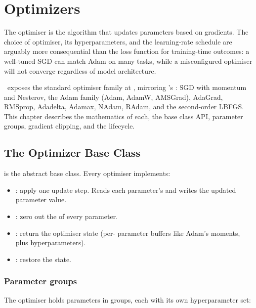 \chapter{Optimizers}
\label{ch:optimizers}

The optimiser is the algorithm that updates parameters based on
gradients. The choice of optimiser, its hyperparameters, and the
learning-rate schedule are arguably more consequential than the
loss function for training-time outcomes: a well-tuned SGD can
match Adam on many tasks, while a misconfigured optimiser will
not converge regardless of model architecture.

\Lucid\ exposes the standard optimiser family at ,
mirroring 's : SGD with momentum
and Nesterov, the Adam family (Adam, AdamW, AMSGrad), AdaGrad,
RMSprop, Adadelta, Adamax, NAdam, RAdam, and the second-order
LBFGS. This chapter describes the mathematics of each, the
 base class API, parameter groups, gradient
clipping, and the lifecycle.

\section{The Optimizer Base Class}
\label{sec:optimizers:base_class}

 is the abstract base class. Every
optimiser implements:

\begin{itemize}
  \item {}: apply one update step. Reads each parameter's
     and writes the updated parameter value.
  \item {}: zero out the
     of every parameter.
  \item {}: return the optimiser state (per-
    parameter buffers like Adam's moments, plus hyperparameters).
  \item {}: restore the state.
\end{itemize}

\subsection{Parameter groups}
\label{ssec:optimizers:param_groups}

The optimiser holds parameters in groups, each with its own
hyperparameter set:

